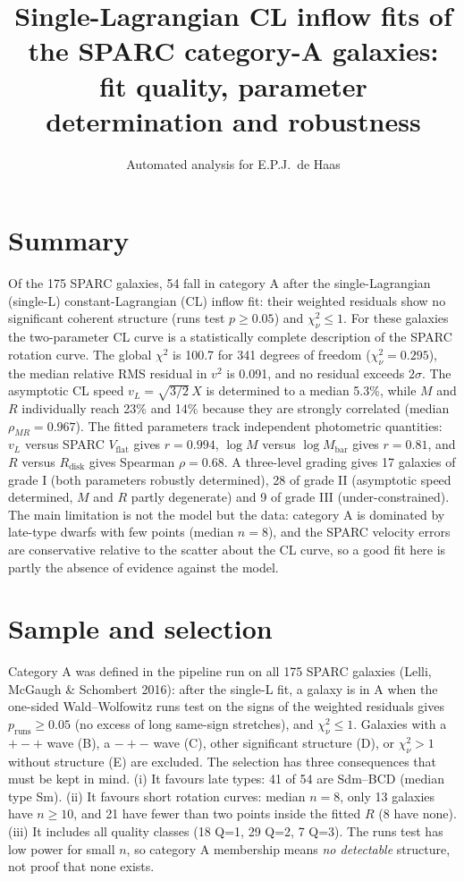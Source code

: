 \documentclass[10pt]{article}
\title{\bfseries Single-Lagrangian CL inflow fits of the SPARC category-A galaxies:\\ fit quality, parameter determination and robustness}
\author{Automated analysis for E.P.J.\ de Haas}\date{}
\begin{document}
\maketitle
\section*{Summary}
Of the 175 SPARC galaxies, 54 fall in category A after the single-Lagrangian (single-L) constant-Lagrangian (CL) inflow fit: their weighted residuals show no significant coherent structure (runs test $p\ge0.05$) and $\chi^2_\nu\le1$. For these galaxies the two-parameter CL curve is a statistically complete description of the SPARC rotation curve. The global $\chi^2$ is 100.7 for 341 degrees of freedom ($\chi^2_\nu=0.295$), the median relative RMS residual in $v^2$ is 0.091, and no residual exceeds $2\sigma$. The asymptotic CL speed $v_L=\sqrt{3/2}\,X$ is determined to a median 5.3\%, while $M$ and $R$ individually reach 23\% and 14\% because they are strongly correlated (median $\rho_{MR}=0.967$). The fitted parameters track independent photometric quantities: $v_L$ versus SPARC $V_\mathrm{flat}$ gives $r=0.994$, $\log M$ versus $\log M_\mathrm{bar}$ gives $r=0.81$, and $R$ versus $R_\mathrm{disk}$ gives Spearman $\rho=0.68$. A three-level grading gives 17 galaxies of grade I (both parameters robustly determined), 28 of grade II (asymptotic speed determined, $M$ and $R$ partly degenerate) and 9 of grade III (under-constrained). The main limitation is not the model but the data: category A is dominated by late-type dwarfs with few points (median $n=8$), and the SPARC velocity errors are conservative relative to the scatter about the CL curve, so a good fit here is partly the absence of evidence against the model.

\section{Sample and selection}
Category A was defined in the pipeline run on all 175 SPARC galaxies (Lelli, McGaugh \& Schombert 2016): after the single-L fit, a galaxy is in A when the one-sided Wald--Wolfowitz runs test on the signs of the weighted residuals gives $p_\mathrm{runs}\ge0.05$ (no excess of long same-sign stretches), and $\chi^2_\nu\le1$. Galaxies with a $+-+$ wave (B), a $-+-$ wave (C), other significant structure (D), or $\chi^2_\nu>1$ without structure (E) are excluded.
The selection has three consequences that must be kept in mind. (i) It favours late types: 41 of 54 are Sdm--BCD (median type Sm). (ii) It favours short rotation curves: median $n=8$, only 13 galaxies have $n\ge10$, and 21 have fewer than two points inside the fitted $R$ (8 have none). (iii) It includes all quality classes (18 Q=1, 29 Q=2, 7 Q=3). The runs test has low power for small $n$, so category A membership means \emph{no detectable} structure, not proof that none exists.
\end{document}

